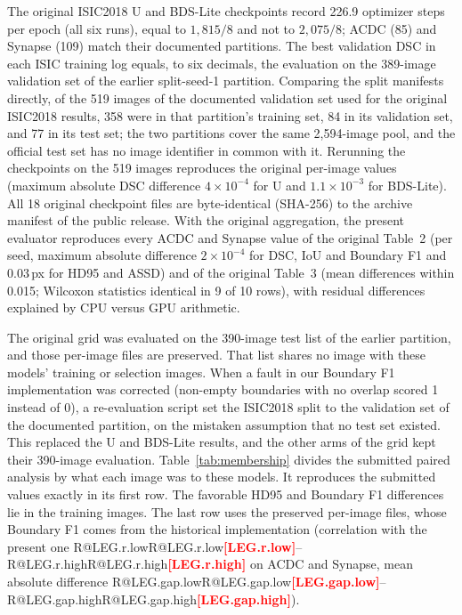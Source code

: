 \documentclass[10pt]{article}
\makeatletter
\newcommand{\R}[1]{\ifcsname R@#1\endcsname\csname R@#1\endcsname\else\textbf{\textcolor{red}{[#1]}}\fi}
\renewcommand\paragraph{\@startsection{paragraph}{4}{\z@}{1.6ex \@plus .5ex \@minus .2ex}{-1em}{\normalfont\normalsize\bfseries}}
\newcommand{\fitwidth}[1]{\sbox{\fitbox}{#1}\ifdim\wd\fitbox>\linewidth\resizebox{\linewidth}{!}{\usebox{\fitbox}}\else\usebox{\fitbox}\fi}
\makeatother
\begin{document}
\paragraph{Evidence.} The original ISIC2018 U and BDS-Lite checkpoints record 226.9 optimizer steps per epoch (all six runs), equal to $1{,}815/8$ and not to $2{,}075/8$; ACDC (85) and Synapse (109) match their documented partitions. The best validation DSC in each ISIC training log equals, to six decimals, the evaluation on the 389-image validation set of the earlier split-seed-1 partition. Comparing the split manifests directly, of the 519 images of the documented validation set used for the original ISIC2018 results, 358 were in that partition's training set, 84 in its validation set, and 77 in its test set; the two partitions cover the same 2,594-image pool, and the official test set has no image identifier in common with it. Rerunning the checkpoints on the 519 images reproduces the original per-image values (maximum absolute DSC difference $4\times10^{-4}$ for U and $1.1\times10^{-3}$ for BDS-Lite). All 18 original checkpoint files are byte-identical (SHA-256) to the archive manifest of the public release. With the original aggregation, the present evaluator reproduces every ACDC and Synapse value of the original Table~2 (per seed, maximum absolute difference $2\times10^{-4}$ for DSC, IoU and Boundary F1 and 0.03\,px for HD95 and ASSD) and of the original Table~3 (mean differences within 0.015; Wilcoxon statistics identical in 9 of 10 rows), with residual differences explained by CPU versus GPU arithmetic.

\paragraph{How the error arose.} The original grid was evaluated on the 390-image test list of the earlier partition, and those per-image files are preserved. That list shares no image with these models' training or selection images. When a fault in our Boundary F1 implementation was corrected (non-empty boundaries with no overlap scored 1 instead of 0), a re-evaluation script set the ISIC2018 split to the validation set of the documented partition, on the mistaken assumption that no test set existed. This replaced the U and BDS-Lite results, and the other arms of the grid kept their 390-image evaluation. Table~\ref{tab:membership} divides the submitted paired analysis by what each image was to these models. It reproduces the submitted values exactly in its first row. The favorable HD95 and Boundary F1 differences lie in the training images. The last row uses the preserved per-image files, whose Boundary F1 comes from the historical implementation (correlation with the present one \R{LEG.r.low}--\R{LEG.r.high} on ACDC and Synapse, mean absolute difference \R{LEG.gap.low}--\R{LEG.gap.high}).
\begin{table}[!htbp]\centering
\fitwidth{}
\caption{\label{tab:membership}BDS-Lite minus U, original ISIC2018 models, seed-averaged paired differences with 95\% bootstrap intervals over images, positive favoring BDS-Lite. Post hoc.}
\end{table}
\end{document}
